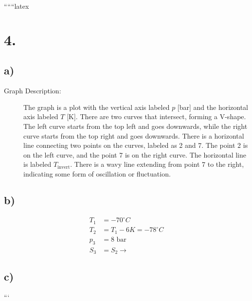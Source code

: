 
``````latex


\section*{4.}
\subsection*{a)}
\begin{description}
    \item[Graph Description:] The graph is a plot with the vertical axis labeled \( p \) [bar] and the horizontal axis labeled \( T \) [K]. There are two curves that intersect, forming a V-shape. The left curve starts from the top left and goes downwards, while the right curve starts from the top right and goes downwards. There is a horizontal line connecting two points on the curves, labeled as 2 and 7. The point 2 is on the left curve, and the point 7 is on the right curve. The horizontal line is labeled \( T_{\text{invert}} \). There is a wavy line extending from point 7 to the right, indicating some form of oscillation or fluctuation.
\end{description}

\subsection*{b)}
\begin{align*}
    T_1 &= -70^\circ C \\
    T_2 &= T_1 - 6K = -78^\circ C \\
    p_3 &= 8 \text{ bar} \\
    S_3 &= S_2 \rightarrow
\end{align*}

\subsection*{c)}
```